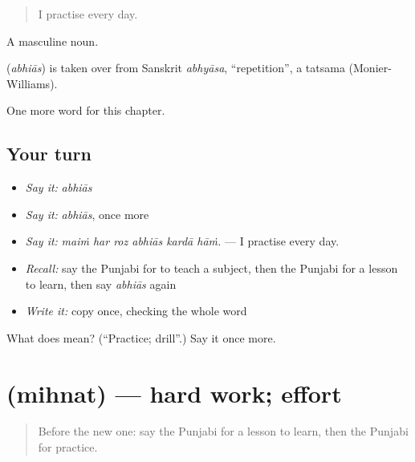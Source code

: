 \begin{quote}
I practise every day.
\end{quote}

A masculine noun.

\begin{cousinweb}
\textbf{} (\emph{abhiās}) is taken over from Sanskrit \emph{abhyāsa}, \textquotedblleft{}repetition\textquotedblright{}, a tatsama (Monier-Williams).
\end{cousinweb}

\begin{grammarlens}[title={What you've built}]
One more word for this chapter.
\end{grammarlens}

\subsection*{Your turn}
\begin{itemize}
\raggedright
  \item \emph{Say it:} \emph{abhiās}
  \item \emph{Say it:} \emph{abhiās}, once more
  \item \emph{Say it:} \emph{maiṁ har roz abhiās kardā hāṁ.} — I practise every day.
  \item \emph{Recall:} say the Punjabi for to teach a subject, then the Punjabi for a lesson to learn, then say \emph{abhiās} again
  \item \emph{Write it:} copy \textbf{} once, checking the whole word
\end{itemize}

\begin{tcolorbox}[breakable,colback=teal!4,colframe=teal!35!black,title={Before you move on}]
What does  mean? (\textquotedblleft{}Practice; drill\textquotedblright{}.) Say it once more.
\end{tcolorbox}
\section[\texorpdfstring{\pa{ਮਿਹਨਤ} (mihnat)}{ਮਿਹਨਤ (mihnat)}]{ (mihnat) — hard work; effort}

\label{lesson:PA-C359-mihnat}



\begin{quote}
Before the new one: say the Punjabi for a lesson to learn, then the Punjabi for practice.
\end{quote}

